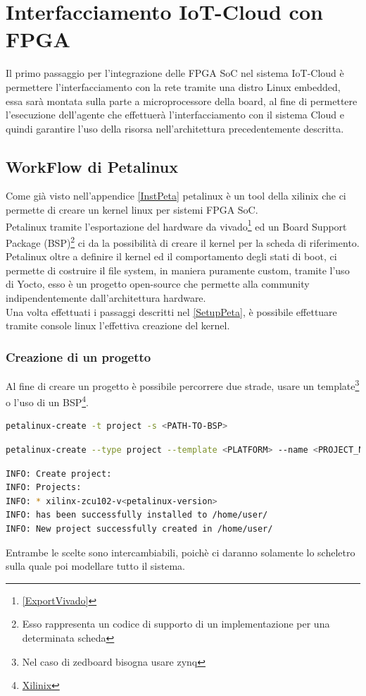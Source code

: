 \chapter{Interfacciamento IoT-Cloud con FPGA}
\label{Linux}
Il primo passaggio per l'integrazione delle FPGA SoC nel sistema IoT-Cloud è permettere l'interfacciamento con la rete tramite una distro Linux embedded, essa sarà montata sulla parte a microprocessore della board, al fine di permettere l'esecuzione dell'agente che effettuerà l'interfacciamento con il sistema Cloud e quindi garantire l'uso della risorsa nell'architettura precedentemente descritta.
\section{WorkFlow di Petalinux}
Come già visto nell'appendice \ref{InstPeta} petalinux è un tool della xilinix che ci permette di creare un kernel linux per sistemi FPGA SoC.\\
Petalinux tramite l'esportazione del hardware da vivado\footnote{\ref{ExportVivado}} ed un Board Support Package (BSP)\footnote{Esso rappresenta un codice di supporto di un implementazione per una determinata scheda} ci da la possibilità di creare il kernel per la scheda di riferimento.\\
Petalinux oltre a definire il kernel ed il comportamento degli stati di boot, ci permette di costruire il file system, in maniera puramente custom, tramite l'uso di Yocto, esso è un progetto open-source che permette alla community indipendentemente dall'architettura hardware.\\
Una volta effettuati i passaggi descritti nel \ref{SetupPeta}, è possibile effettuare tramite console linux l'effettiva creazione del kernel.
\subsection{Creazione di un progetto}
Al fine di creare un progetto è possibile percorrere due strade, usare un template\footnote{Nel caso di zedboard bisogna usare zynq} o l'uso di un BSP\footnote{\href{https://www.xilinx.com/member/forms/download/xef.html?filename=avnet-digilent-zedboard-v2021.2-final.bsp}{Xilinix}}.
\begin{lstlisting}[language=sh, label=lst:sh, caption={Comando creazione progetto con BSP}]
petalinux-create -t project -s <PATH-TO-BSP>
\end{lstlisting}
\begin{lstlisting}[language=sh, label=lst:sh, caption={Comando creazione progetto con il template}]
petalinux-create --type project --template <PLATFORM> --name <PROJECT_NAME> 
\end{lstlisting}
\begin{lstlisting}[language=sh, label=lst:sh, caption={Output atteso}]
INFO: Create project:
INFO: Projects:
INFO: * xilinx-zcu102-v<petalinux-version>
INFO: has been successfully installed to /home/user/
INFO: New project successfully created in /home/user/
\end{lstlisting}
Entrambe le scelte sono intercambiabili, poichè ci daranno solamente lo scheletro sulla quale poi modellare tutto il sistema.

